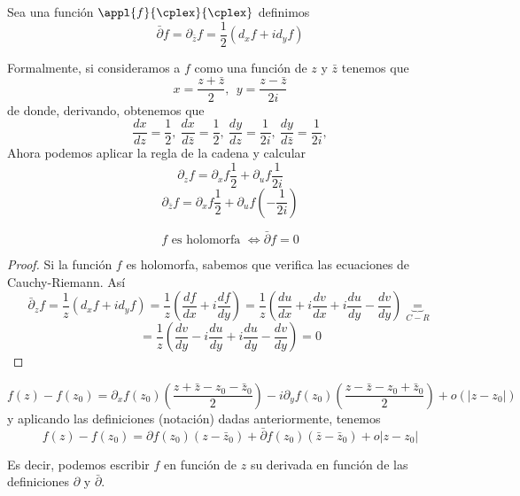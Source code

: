 \documentclass{apuntes}
\begin{document}
\begin{defn}
Sea una función $\appl{f}{\cplex}{\cplex}$ definimos
\[\bar{\partial} f = \partial_{\bar{z}} f = \frac{1}{2}(d_x f + i d_y f)\]
\end{defn}

Formalmente, si consideramos a $f$ como una función de $z$ y $\bar{z}$ tenemos que
\[x = \frac{z+\bar{z}}{2}, \ \ y = \frac{z-\bar{z}}{2i}\]
de donde, derivando, obtenemos que
\[\frac{dx}{dz}=\frac{1}{2}, \ \frac{dx}{d\bar{z}}=\frac{1}{2}, \ \frac{dy}{dz}=\frac{1}{2i}, \ \frac{dy}{d\bar{z}}=\frac{1}{2i},\]
Ahora podemos aplicar la regla de la cadena y calcular
\[\partial_z f = \partial_x f \frac{1}{2}+\partial_u f \frac{1}{2i}\]
\[\partial_{\bar{z}} f = \partial_x f \frac{1}{2}+\partial_u f \left(-\frac{1}{2i}\right)\]

\begin{prop}
\[f\text{ es holomorfa } \iff \bar{\partial}f=0\]
\end{prop}
\begin{proof}
Si la función $f$ es holomorfa, sabemos que verifica las ecuaciones de Cauchy-Riemann. Así
\[\bar{\partial}_z f = \frac{1}{z}(d_x f + i d_y f) = \frac{1}{z} \left(\frac{df}{dx}+i\frac{df}{dy} \right) = \frac{1}{z} \left( \frac{du}{dx}+i\frac{dv}{dx} + i \frac{du}{dy} - \frac{dv}{dy}\right) \underbrace{=}_{C-R}\]
\[=\frac{1}{z} \left( \frac{dv}{dy}-i\frac{du}{dy} + i \frac{du}{dy} - \frac{dv}{dy}\right) = 0\]
\end{proof}

\begin{prop}
\[f(z)-f(z_0)=\partial_xf(z_0)\left(\frac{z+\bar{z}-z_0-\bar{z}_0}{2}\right)-i\partial_y f (z_0)\left( \frac{z-\bar{z}-z_0+\bar{z}_0}{2}\right) + o (|z-z_0|)\]
y aplicando las definiciones (notación) dadas anteriormente, tenemos
\[f(z)-f(z_0)= \partial f(z_0)(z-\bar{z}_0)+\bar{\partial}f(z_0)(\bar{z}-\bar{z}_0)+o|z-z_0|\]

Es decir, podemos escribir $f$ en función de $z$ su derivada en función de las definiciones $\partial$ y $\bar{\partial}$.
\end{prop}
\end{document}
